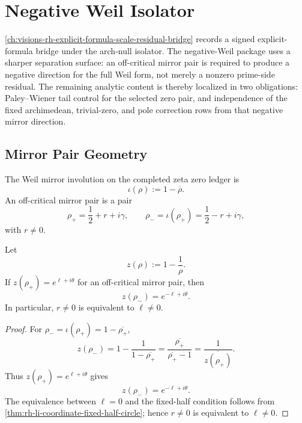 \chapter{Negative Weil Isolator}
\label{ch:visions-rh-negative-weil-isolator}

\autoref{ch:visions-rh-explicit-formula-scale-residual-bridge} records a
signed explicit-formula bridge under the arch-null isolator.  The
negative-Weil package uses a sharper separation surface: an
off-critical mirror pair is required to produce a negative direction for
the full Weil form, not merely a nonzero prime-side residual.  The
remaining analytic content is thereby localized in two obligations:
Paley--Wiener tail control for the selected zero pair, and independence
of the fixed archimedean, trivial-zero, and pole correction rows from
that negative mirror direction.

\section{Mirror Pair Geometry}
\label{sec:rh-negative-weil-mirror-pair-geometry}

\begin{definition}
\label{def:rh-weil-mirror-involution}
The Weil mirror involution on the completed zeta zero ledger is
$$
\iota(\rho):=1-\overline{\rho}.
$$
An off-critical mirror pair is a pair
$$
\rho_+=\frac12+r+i\gamma,
\qquad
\rho_-=\iota(\rho_+)=\frac12-r+i\gamma,
$$
with $r\ne0$.
\end{definition}

\begin{lemma}
\label{lem:rh-li-radius-reverses-across-mirror}
Let
$$
z(\rho):=1-\frac1\rho.
$$
If $z(\rho_+)=e^{\ell+i\theta}$ for an off-critical mirror pair, then
$$
z(\rho_-)=e^{-\ell+i\theta}.
$$
In particular, $r\ne0$ is equivalent to $\ell\ne0$.
\end{lemma}

\begin{proof}
For $\rho_-=\iota(\rho_+)=1-\overline{\rho_+}$,
$$
z(\rho_-)
=
1-\frac1{1-\overline{\rho_+}}
=
\frac{\overline{\rho_+}}{\overline{\rho_+}-1}
=
\frac1{\overline{z(\rho_+)}}.
$$
Thus $z(\rho_+)=e^{\ell+i\theta}$ gives
$$
z(\rho_-)=e^{-\ell+i\theta}.
$$
The equivalence between $\ell=0$ and the fixed-half condition follows
from \autoref{thm:rh-li-coordinate-fixed-half-circle}; hence
$r\ne0$ is equivalent to $\ell\ne0$.
\end{proof}

